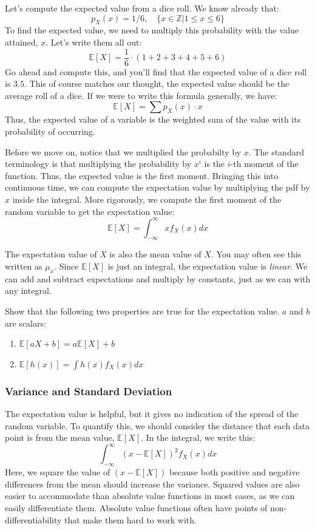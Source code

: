 \begin{example}
Let's compute the expected value from a dice roll. We know already that:
$$p_X(x)=1/6,\quad\{x\in\mathbb{Z}|1\le x\le 6\}$$
To find the expected value, we need to multiply this probability with the value attained, $x$. Let's write them all out:
$$\mathbb{E}[X]=\frac{1}{6}\cdot (1+2+3+4+5+6)$$
Go ahead and compute this, and you'll find that the expected value of a dice roll is $3.5$. This of course matches our thought, the expected value should be the average roll of a dice. If we were to write this formula generally, we have:
$$\mathbb{E}[X]=\sum p_X(x)\cdot x$$
Thus, the expected value of a variable is the weighted sum of the value with its probability of occurring.
\end{example}

Before we move on, notice that we multiplied the probabilty by $x$. The standard terminology is that multiplying the probability by $x^i$ is the $i$-th moment of the function. Thus, the expected value is the first moment. Bringing this into continuous time, we can compute the expectation value by multiplying the \gls{pdf} by $x$ inside the integral. More rigorously, we compute the first moment of the random variable to get the expectation value:
$$\mathbb{E}[X]=\int_{-\infty}^\infty{xf_X(x)dx}$$

The expectation value of $X$ is also the mean value of $X$. You may often see this written as $\mu_x$. Since $\mathbb{E}[X]$ is just an integral, the expectation value is \textit{linear}. We can add and subtract expectations and multiply by constants, just as we can with any integral.

\begin{exercise}\label{prob:expectation}
Show that the following two properties are true for the expectation value. $a$ and $b$ are scalars:
\begin{enumerate}
    \item $\mathbb{E}[aX+b]=a\mathbb{E}[X]+b$
    \item $\mathbb{E}[h(x)]=\int h(x)f_X(x)dx$
\end{enumerate}
\end{exercise}

\subsubsection{Variance and Standard Deviation}
The expectation value is helpful, but it gives no indication of the spread of the random variable. To quantify this, we should consider the distance that each data point is from the mean value, $\mathbb{E}[X]$. In the integral, we write this:
$$\int_{-\infty}^\infty{(x-\mathbb{E}[X])^2f_X(x)dx}$$
Here, we square the value of $(x-\mathbb{E}[X])$ because both positive and negative differences from the mean should increase the variance. Squared values are also easier to accommodate than absolute value functions in most cases, as we can easily differentiate them. Absolute value functions often have points of non-differentiability that make them hard to work with.


